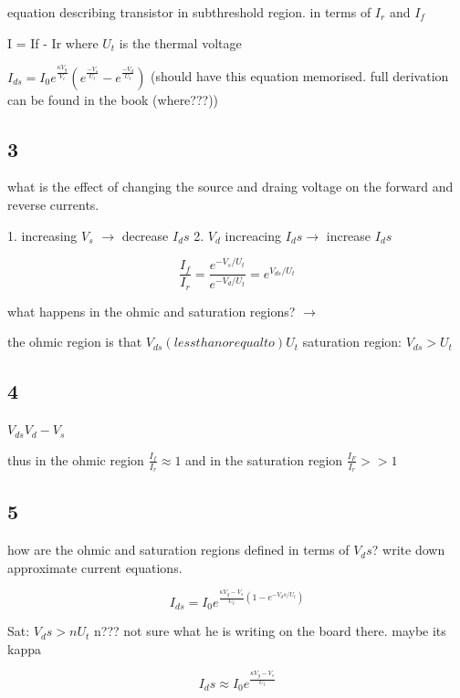 \documentclass{article}
\begin{document}
equation describing transistor in subthreshold region. in terms of $I_r$ and $I_f$ 

I = If - Ir
where $U_t$ is the thermal voltage

\(I_{ds}= I_0 e^{\frac{\kappa V_g}{V_c}}\left( e^{\frac{-V_s}{U_t}}-e^{\frac{-V_d}{U_t}}\right)\)
(should have this equation memorised. full derivation can be found in the book (where???)) 


\subsection{3}
what is the effect of changing the source and draing voltage on the forward and reverse currents. 

1. increasing \(V_s\)  $\rightarrow$ decrease $I_ds$ 
2. $V_d$ increacing $I_ds \rightarrow $ increase $I_ds$


\begin{equation}
    \frac{I_f}{I_r} = \frac{e^{-V_s/U_t}}{e^{-V_d/U_t}}= e^{V_{ds}/U_t}
\end{equation}

what happens in the ohmic and saturation regions? $\rightarrow$

the ohmic region is that $V_{ds} (lessthanorequalto) U_t $
saturation region: $V_{ds} > U_t$


\subsection{4}
$V_{ds} V_d - V_s $

thus in the ohmic region
\(\frac{I_f}{I_r} \approx 1\)
and in the saturation region
\(\frac{I_F}{I_r}>>1\)


\subsection{5}
how are the ohmic and saturation regions defined in terms of $V_ds$? write down approximate current equations.

\begin{equation}
    I_{ds}= I_0 e^{\frac{\kappa V_g - V_s}{U_t} (1-e ^{-V_ds / U_t})}
\end{equation}

Sat: \(V_ds > nU_t\) n??? not sure what he is writing on the board there. maybe its kappa

\begin{equation}
    I_ds \approx I_0 e^{\frac{\kappa V_g - V_s}{U_t}}
\end{equation}
\end{document}
